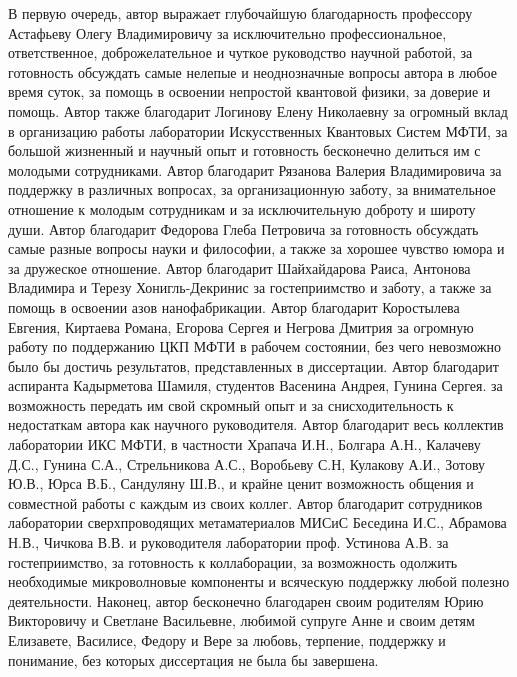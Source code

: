 В первую очередь, автор выражает глубочайшую благодарность профессору Астафьеву Олегу Владимировичу за исключительно профессиональное, ответственное, доброжелательное и чуткое руководство научной работой, за готовность обсуждать самые нелепые и неоднозначные вопросы автора в любое время суток, за помощь в освоении непростой квантовой физики, за доверие и помощь. Автор также благодарит Логинову Елену Николаевну за огромный вклад в организацию работы лаборатории Искусственных Квантовых Систем МФТИ, за большой жизненный и научный опыт и готовность бесконечно делиться им с молодыми сотрудниками. Автор благодарит Рязанова Валерия Владимировича за поддержку в различных вопросах, за организационную заботу, за внимательное отношение к молодым сотрудникам и за исключительную доброту и широту души. Автор благодарит Федорова Глеба Петровича за готовность обсуждать самые разные вопросы науки и философии, а также за хорошее чувство юмора и за дружеское отношение. Автор благодарит Шайхайдарова Раиса, Антонова Владимира и Терезу Хонигль-Декринис за гостеприимство и  заботу, а также за помощь в освоении азов нанофабрикации. Автор благодарит Коростылева Евгения, Киртаева Романа, Егорова Сергея и Негрова Дмитрия за огромную работу по поддержанию ЦКП МФТИ в рабочем состоянии, без чего невозможно было бы достичь результатов, представленных в диссертации. Автор благодарит аспиранта Кадырметова Шамиля, студентов Васенина Андрея, Гунина Сергея. за возможность передать им свой скромный опыт и за снисходительность к недостаткам автора как научного руководителя.  Автор благодарит весь коллектив лаборатории ИКС МФТИ, в частности Храпача И.Н., Болгара А.Н., Калачеву Д.С., Гунина С.А., Стрельникова А.С., Воробьеву С.Н, Кулакову А.И., Зотову Ю.В., Юрса В.Б., Сандуляну Ш.В., и крайне ценит возможность общения и совместной работы с каждым из своих коллег.  Автор благодарит сотрудников лаборатории сверхпроводящих метаматериалов МИСиС Беседина И.С., Абрамова Н.В., Чичкова В.В. и руководителя лаборатории проф. Устинова А.В. за гостеприимство, за готовность к коллаборации, за возможность одолжить необходимые микроволновые компоненты и всяческую поддержку любой полезно деятельности. Наконец, автор бесконечно благодарен своим родителям Юрию Викторовичу и Светлане Васильевне, любимой супруге Анне и своим детям Елизавете, Василисе, Федору и Вере за любовь, терпение, поддержку и понимание, без которых диссертация не была бы завершена. 

